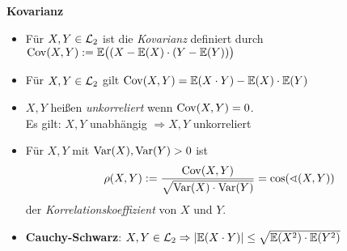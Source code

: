 \textbf{Kovarianz}
\begin{itemize}
\item Für $X,Y\in\mathcal{L}_2$ ist die \textit{Kovarianz} definiert durch
 \mbox{$\operatorname{Cov}(X,Y) := \mathbb{E}\big( (X-\mathbb{E}(X) \cdot (Y-\mathbb{E}(Y)) \big)$}

\item Für $X,Y\in\mathcal{L}_2$ gilt $\operatorname{Cov}(X,Y) = \mathbb{E}(X \cdot Y) - \mathbb{E}(X) \cdot \mathbb{E}(Y)$

\item $X,Y$ heißen \textit{unkorreliert} wenn $\operatorname{Cov}(X,Y) = 0$.\\
  Es gilt: $X,Y$ unabhängig $\Rightarrow X,Y$ unkorreliert
  \marginpar{\vspace{-3.45em}\begin{equation}\label{unabhaengig_kor}\end{equation}}

\item Für $X,Y$ mit $\operatorname{Var}(X),\operatorname{Var}(Y)>0$ ist
  \[
    \rho(X,Y) := \frac{\operatorname{Cov}(X,Y)}{\sqrt{\operatorname{Var}(X)\cdot\operatorname{Var}(Y)}} =
    \cos(\sphericalangle (X,Y))
  \]
  der \textit{Korrelationskoeffizient} von $X$ und $Y$.

\item \textbf{Cauchy-Schwarz}: $X,Y\in\mathcal{L}_2
  \Rightarrow |\mathbb{E}(X \cdot Y)| \leq \sqrt{\mathbb{E}(X^2) \cdot \mathbb{E}(Y^2)}$
\end{itemize}
